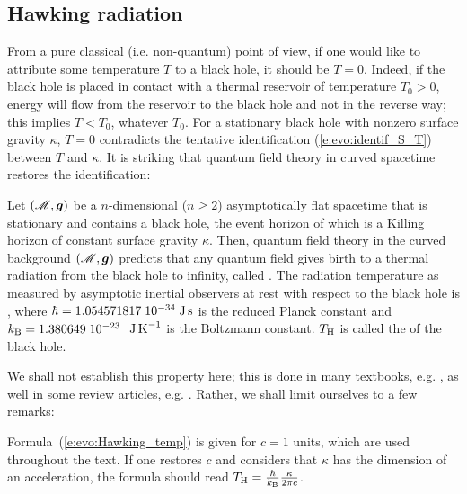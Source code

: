 \subsection{Hawking radiation} \label{s:evo:Hawking_rad}

From a pure classical (i.e. non-quantum) point of view, if one would like to attribute some
temperature $T$ to a black hole, it should be $T=0$. Indeed, if the black hole is placed in contact with a thermal reservoir of temperature $T_0>0$, energy will flow from the reservoir to the black hole and not in the reverse way; this implies $T<T_0$, whatever $T_0$.
For a stationary black hole with nonzero surface gravity $\kappa$, $T=0$ contradicts the tentative identification (\ref{e:evo:identif_S_T}) between $T$ and $\kappa$.
It is striking that quantum field theory in curved spacetime
restores the identification:

\begin{prop}
Let $(\mathscr{M},\bm{g})$ be a $n$-dimensional ($n\geq 2$) asymptotically flat
spacetime that is stationary and contains a black hole, the event horizon
of which is a Killing horizon of constant surface gravity $\kappa$.
Then, quantum field theory in the curved background $(\mathscr{M},\bm{g})$
predicts that any quantum field gives birth to a thermal radiation
from the black hole to infinity, called
. The radiation temperature
as measured by asymptotic inertial observers at rest with respect to the black hole
is
\be \label{e:evo:Hawking_temp}
     ,
\ee
where $\hbar = 1.054571817\; 10^{-34} {\rm\; J\, s}$ is the reduced Planck constant and
$k_{\rm B} = 1.380649\; 10^{-23}$ ${\rm\;  J\, K}^{-1}$ is the Boltzmann constant. $T_{\rm H}$ is called the
 of the black hole.
\end{prop}

We shall not establish this property here; this is done in many textbooks,
e.g. \cite{Wald84,Wald94,FroloN98,Carro04,FabbrN05}, as well in some review
articles, e.g. \cite{BroutMPS95,Damou04}. Rather, we shall limit
ourselves to a few remarks:

\begin{remark}\label{r:evo:Hawking_temp_units}
Formula~(\ref{e:evo:Hawking_temp}) is given for $c=1$
units, which are used throughout the text. If one restores $c$ and considers
that $\kappa$ has the dimension of an acceleration, the formula should read
$T_{\rm H} = \frac{\hbar}{k_{\rm B}} \frac{\kappa}{2\pi c}$.
\end{remark}

